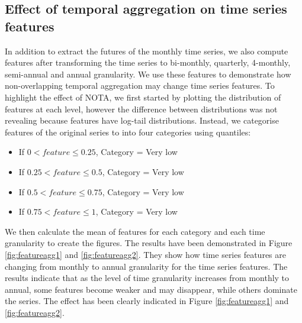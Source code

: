 \documentclass[]{elsarticle} %
\providecommand{\tightlist}{%
  \setlength{\itemsep}{0pt}\setlength{\parskip}{0pt}}
\begin{document}
\hypertarget{taeffect}{%
\subsection{Effect of temporal aggregation on time series
features}\label{taeffect}}

In addition to extract the futures of the monthly time series, we also
compute features after transforming the time series to bi-monthly,
quarterly, 4-monthly, semi-annual and annual granularity. We use these
features to demonstrate how non-overlapping temporal aggregation may
change time series features. To highlight the effect of NOTA, we first
started by plotting the distribution of features at each level, however
the difference between distributions was not revealing because features
have log-tail distributions. Instead, we categorise features of the
original series to into four categories using quantiles:

\begin{itemize}
\tightlist
\item
  If \(0 < feature \leqslant 0.25\), Category = Very low
\item
  If \(0.25 < feature \leqslant 0.5\), Category = Very low
\item
  If \(0.5 < feature \leqslant 0.75\), Category = Very low
\item
  If \(0.75 < feature \leqslant 1\), Category = Very low
\end{itemize}

We then calculate the mean of features for each category and each time
granularity to create the figures. The results have been demonstrated in
Figure \ref{fig:featureagg1} and \ref{fig:featureagg2}. They show how
time series features are changing from monthly to annual granularity for
the time series features. The results indicate that as the level of time
granularity increases from monthly to annual, some features become
weaker and may disappear, while others dominate the series. The effect
has been clearly indicated in Figure \ref{fig:featureagg1} and
\ref{fig:featureagg2}.
\end{document}

